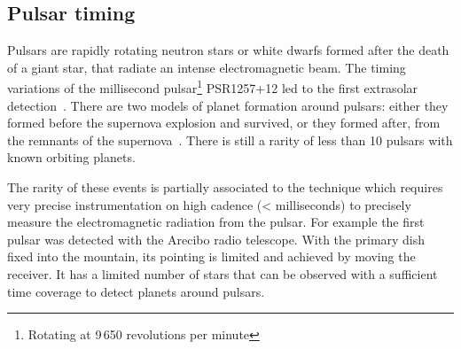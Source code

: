 \subsection{Pulsar timing}
\label{subsec:pulsar_timing}
Pulsars are rapidly rotating neutron stars or white dwarfs formed after the death of a giant star, that radiate an intense electromagnetic beam.
The timing variations of the millisecond pulsar\footnote{Rotating at 9\,650 revolutions per minute} {PSR1257+12} led to the first extrasolar  detection~\citep{wolszczan_planetary_1992}.
There are two models of planet formation around pulsars: either they formed before the supernova explosion and survived, or they formed after, from the remnants of the supernova~\citep{starovoit_existence_2017}.
There is still a rarity of less than 10 pulsars with known orbiting planets.

The rarity of these events is partially associated to the technique which requires very precise instrumentation on high cadence (< milliseconds) to precisely measure the electromagnetic radiation from the pulsar.
For example the first pulsar was detected with the Arecibo radio telescope.
With the primary dish fixed into the mountain, its pointing is limited and achieved by moving the receiver.
It has a limited number of stars that can be observed with a sufficient time coverage to detect planets around pulsars.

